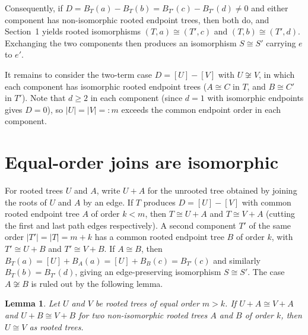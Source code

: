 \documentclass[10pt]{article}
\newtheorem{lemma}[theorem]{Lemma}
\begin{document}
Consequently, if $D = B_T(a)-B_T(b) = B_{T'}(c)-B_{T'}(d)\neq 0$ and either component has non-isomorphic rooted endpoint trees, then both do, and Section~1 yields rooted isomorphisms $(T,a)\cong (T',c)$ and $(T,b)\cong (T',d)$. Exchanging the two components then produces an isomorphism $S\cong S'$ carrying $e$ to $e'$.

It remains to consider the two-term case $D = [U]-[V]$ with $U\not\cong V$, in which each component has isomorphic rooted endpoint trees ($A\cong C$ in $T$, and $B\cong C'$ in $T'$). Note that $d\ge 2$ in each component (since $d=1$ with isomorphic endpoints gives $D=0$), so $|U|=|V|=:m$ exceeds the common endpoint order in each component.

\section{Equal-order joins are isomorphic}

For rooted trees $U$ and $A$, write $U+A$ for the unrooted tree obtained by joining the roots of $U$ and $A$ by an edge. If $T$ produces $D=[U]-[V]$ with common rooted endpoint tree $A$ of order $k<m$, then $T\cong U+A$ and $T\cong V+A$ (cutting the first and last path edges respectively). A second component $T'$ of the same order $|T'|=|T|=m+k$ has a common rooted endpoint tree $B$ of order $k$, with $T'\cong U+B$ and $T'\cong V+B$. If $A\cong B$, then $B_T(a)=[U]+B_A(a)=[U]+B_B(c)=B_{T'}(c)$ and similarly $B_T(b)=B_{T'}(d)$, giving an edge-preserving isomorphism $S\cong S'$. The case $A\not\cong B$ is ruled out by the following lemma.

\begin{lemma}\label{lem:equal-order}
Let $U$ and $V$ be rooted trees of equal order $m>k$. If $U+A\cong V+A$ and $U+B\cong V+B$ for two non-isomorphic rooted trees $A$ and $B$ of order $k$, then $U\cong V$ as rooted trees.
\end{lemma}
\end{document}
